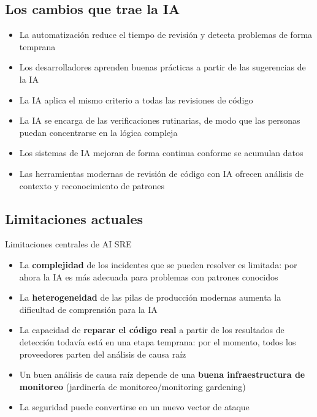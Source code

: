 \subsection{Los cambios que trae la IA}

\begin{itemize}
    \item La automatización reduce el tiempo de revisión y detecta problemas de forma temprana
    \item Los desarrolladores aprenden buenas prácticas a partir de las sugerencias de la IA
    \item La IA aplica el mismo criterio a todas las revisiones de código
    \item La IA se encarga de las verificaciones rutinarias, de modo que las personas puedan concentrarse en la lógica compleja
    \item Los sistemas de IA mejoran de forma continua conforme se acumulan datos
    \item Las herramientas modernas de revisión de código con IA ofrecen análisis de contexto y reconocimiento de patrones
\end{itemize}

\subsection{Limitaciones actuales}

\begin{warningbox}{Limitaciones centrales de AI SRE}
\begin{itemize}
    \item La \textbf{complejidad} de los incidentes que se pueden resolver es limitada: por ahora la IA es más adecuada para problemas con patrones conocidos
    \item La \textbf{heterogeneidad} de las pilas de producción modernas aumenta la dificultad de comprensión para la IA
    \item La capacidad de \textbf{reparar el código real} a partir de los resultados de detección todavía está en una etapa temprana: por el momento, todos los proveedores parten del análisis de causa raíz
    \item Un buen análisis de causa raíz depende de una \textbf{buena infraestructura de monitoreo} (jardinería de monitoreo/monitoring gardening)
    \item La seguridad puede convertirse en un nuevo vector de ataque
\end{itemize}
\end{warningbox}

